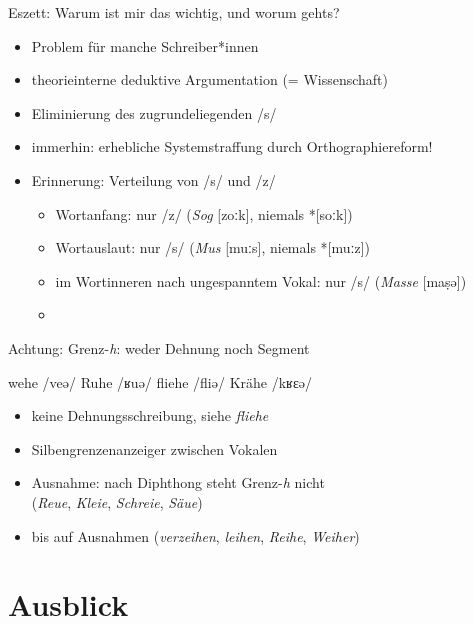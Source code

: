 \begin{frame}
  {Eszett: Warum ist mir das wichtig, und worum gehts?}
  \pause
  \begin{itemize}[<+->]
    \item Problem für manche Schreiber*innen
    \item theorieinterne deduktive Argumentation (= Wissenschaft)
    \item Eliminierung des zugrundeliegenden /s/
      \Halbzeile
    \item immerhin: erhebliche \alert{Systemstraffung} durch Orthographiereform!
      \Halbzeile
    \item Erinnerung: Verteilung von /s/ und /z/
      \begin{itemize}[<+->]
        \item Wortanfang: nur /z/ (\textit{Sog} [zoːk], niemals *[soːk])
        \item Wortauslaut: nur /s/ (\textit{Mus} [muːs], niemals *[muːz])
        \item \alert{im Wortinneren nach ungespanntem Vokal: nur /s/ (\textit{Masse} [maṣə])}
        \item {}
      \end{itemize}
  \end{itemize}
\end{frame}




\begin{frame}
  {Achtung: Grenz-\textit{h}: weder Dehnung noch Segment}
  \pause
  \begin{exe}
    \ex wehe /veə/
    \pause
    \ex Ruhe /ʁuə/
    \pause
    \ex fliehe /fliə/
    \pause
    \ex Krähe /kʁɛə/
  \end{exe}
  \pause
  \begin{itemize}[<+->]
    \item keine Dehnungsschreibung, siehe \textit{fliehe}
    \item \alert{Silbengrenzenanzeiger} zwischen Vokalen
      \Halbzeile
    \item Ausnahme: nach Diphthong steht Grenz-\textit{h} nicht\\
      (\textit{Reue}, \textit{Kleie}, \textit{Schreie}, \textit{Säue})
    \item bis auf Ausnahmen (\textit{verzeihen}, \textit{leihen}, \textit{Reihe}, \textit{Weiher})
  \end{itemize}
\end{frame}


\section{Ausblick}


